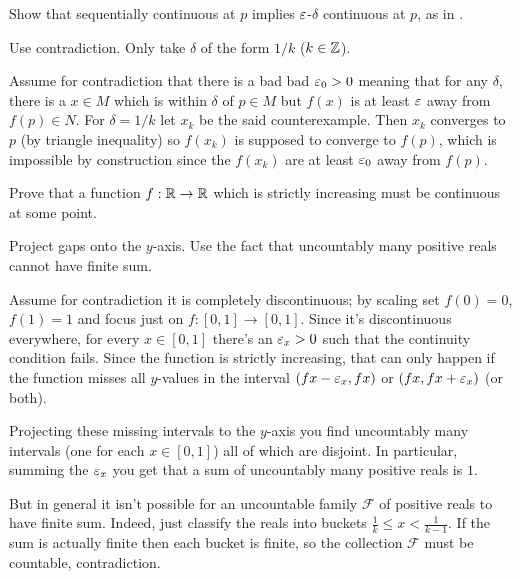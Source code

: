 \begin{problem}
	\label{prob:sequential}
	Show that sequentially continuous at $p$ implies $\varepsilon$-$\delta$ continuous at $p$,
	as in .
	\begin{hint}
		Use contradiction. Only take $\delta$ of the form $1/k$ ($k \in \mathbb Z$).
	\end{hint}
	\begin{sol}
		Assume for contradiction that there is a bad bad $\varepsilon_0 > 0$
		meaning that for any $\delta$, there is a $x \in M$ which is within $\delta$
		of $p \in M$ but $f(x)$ is at least $\varepsilon$ away from $f(p) \in N$.
		For $\delta = 1/k$ let $x_k$ be the said counterexample.
		Then $x_k$ converges to $p$ (by triangle inequality) so
		$f(x_k)$ is supposed to converge to $f(p)$,
		which is impossible by construction since the $f(x_k)$ 
		are at least $\varepsilon_0$ away from $f(p)$.
	\end{sol}
\end{problem}

\begin{problem}
	\gim
	Prove that a function $f : \mathbb R \to \mathbb R$ which is strictly increasing
	must be continuous at some point.
	\begin{hint}
		Project gaps onto the $y$-axis.
		Use the fact that uncountably many positive reals cannot have finite sum.
	\end{hint}
	\begin{sol}
		Assume for contradiction it is completely discontinuous;
		by scaling set $f(0) = 0$, $f(1) = 1$ and focus just on $f : [0,1] \to [0,1]$.
		Since it's discontinuous everywhere,
		for every $x \in [0,1]$ there's an $\varepsilon_x > 0$ such that the continuity condition fails.
		Since the function is strictly increasing, that can only happen if the
		function misses all $y$-values in the interval $(fx-\varepsilon_x, fx)$ or $(fx, fx+\varepsilon_x)$ (or both).

		Projecting these missing intervals to the $y$-axis you find uncountably
		many intervals (one for each $x \in [0,1]$) all of which are disjoint.
		In particular, summing the $\varepsilon_x$ you get that a sum of uncountably
		many positive reals is $1$.

		But in general it isn't possible for an uncountable family $\mathcal F$
		of positive reals to have finite sum.
		Indeed, just classify the reals into buckets $\frac1k \le x < \frac1{k-1}$.
		If the sum is actually finite then each bucket is finite,
		so the collection $\mathcal F$ must be countable, contradiction.
	\end{sol}
\end{problem}

